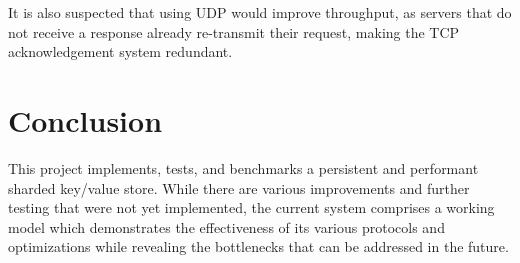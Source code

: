\documentclass[letterpaper,10pt]{article}
\begin{document}
It is also suspected that using UDP would improve throughput, as servers that do not receive a response already re-transmit their request, making the TCP acknowledgement system redundant.

\section{Conclusion}
This project implements, tests, and benchmarks a persistent and
performant sharded key/value store.  While there are various
improvements and further testing that were not yet implemented, the
current system comprises a working model which demonstrates the
effectiveness of its various protocols and optimizations while
revealing the bottlenecks that can be addressed in the future.



\end{document}

